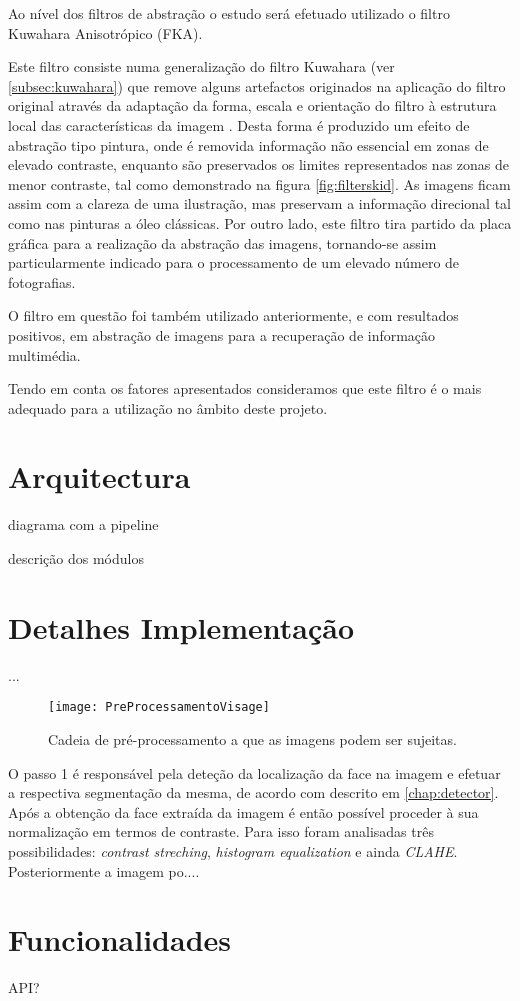 Ao nível dos filtros de abstração o estudo será efetuado utilizado o filtro Kuwahara Anisotrópico (FKA).

Este filtro consiste numa generalização do filtro Kuwahara (ver \ref{subsec:kuwahara}) que remove alguns artefactos originados na aplicação do filtro original através da adaptação da forma, escala e orientação do filtro à estrutura local das características da imagem \cite{Kyprianidis2009}. Desta forma é produzido um efeito de abstração tipo pintura, onde é removida informação não essencial em zonas de elevado contraste, enquanto são preservados os limites representados nas zonas de menor contraste, tal como demonstrado na figura \ref{fig:filterskid}. As imagens ficam assim com a clareza de uma ilustração, mas preservam a informação direcional tal como nas pinturas a óleo clássicas. Por outro lado, este filtro tira partido da placa gráfica para a realização da abstração das imagens, tornando-se assim particularmente indicado para o processamento de um elevado número de fotografias.

O filtro em questão foi também utilizado anteriormente, e com resultados positivos, em abstração de imagens para a recuperação de informação multimédia. 

Tendo em conta os fatores apresentados consideramos que este filtro é o mais adequado para a utilização no âmbito deste projeto.
	
\section{Arquitectura}

	diagrama com a pipeline
	
	descrição dos módulos
	
\section{Detalhes Implementação}
...

\begin{figure}[ht]
  \begin{center}
    \leavevmode
    \texttt{[image: PreProcessamentoVisage]}
    \caption{Cadeia de pré-processamento a que as imagens podem ser sujeitas.}
    \label{fig:preprocessamento}
  \end{center}
\end{figure}

O passo 1 é responsável pela deteção da localização da face na imagem e efetuar a respectiva segmentação da mesma, de acordo com descrito em \ref{chap:detector}. Após a obtenção da face extraída da imagem é então possível proceder à sua normalização em termos de contraste. Para isso foram analisadas três possibilidades: \textit{contrast streching}, \textit{histogram equalization} e ainda \textit{CLAHE}. Posteriormente a imagem po....


\section{Funcionalidades}

	API?
